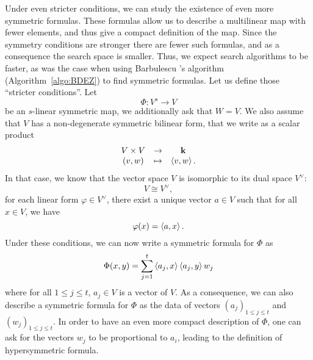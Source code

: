 Under even stricter conditions, we can study the existence of even more
symmetric formulas. These formulas allow us to describe a multilinear map with
fewer elements, and thus give a compact definition of the map. Since the
symmetry conditions are stronger there are fewer such formulas, and as a
consequence the search space is smaller. Thus, we expect search algorithms to be
faster, as was the case when using Barbulescu \etal\!\!\!'s algorithm
(Algorithm~\ref{algo:BDEZ}) to find symmetric formulas. Let us define those
``stricter conditions''. Let
\[
  \Phi:V^s\to V
\]
be an $s$-linear symmetric map, \ie we additionally ask that $W=V$. We also
assume that $V$ has a non-degenerate symmetric bilinear form, that we write as a
scalar product
\[
 \begin{array}{ccc}
 V\times V &\to&\mathbf{k}\\
 (v,w)&\mapsto&\left\langle v,w\right\rangle.
 \end{array}
\]
In that case, we know that the vector space $V$ is isomorphic to its dual space
$V^\vee$:
\[
  V\cong V^\vee,
\]
\ie for each linear form $\varphi\in V^\vee$, there exist a unique vector $a\in
V$ such that for all $x\in V$, we have
\[
  \varphi(x) = \left\langle a,x\right\rangle.
\]
Under these conditions, we can now write a symmetric formula for $\Phi$ as
\[
  \Phi(x, y) = \sum_{j=1}^t\left\langle a_j,x\right\rangle\left\langle a_j,y\right\rangle w_j
\]
where for all $1\leq j\leq t$, $a_j\in V$ is a vector of $V$. As a consequence,
we can also describe a symmetric formula for $\Phi$ as the data of vectors
$(a_j)_{1\leq j\leq t}$ and $(w_j)_{1\leq j\leq t}$. In order to have an even
more compact description of $\Phi$, one can ask for the vectors $w_j$ to be
proportional to $a_i$, leading to the definition of hypersymmetric
formula.
%
%
%
%
%

